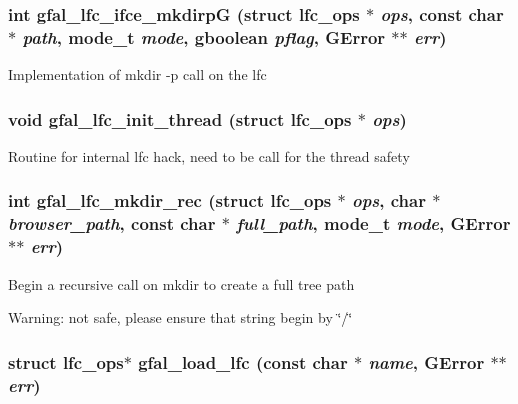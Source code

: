 \subsubsection{\setlength{\rightskip}{0pt plus 5cm}int gfal\_\-lfc\_\-ifce\_\-mkdirp\-G (struct lfc\_\-ops $\ast$ {\em ops}, const char $\ast$ {\em path}, mode\_\-t {\em mode}, gboolean {\em pflag}, GError $\ast$$\ast$ {\em err})}\label{lfc__ifce__ng_8c_9fa43925882e2e196e0020b529827d3c}


Implementation of mkdir -p call on the lfc 
\subsubsection{\setlength{\rightskip}{0pt plus 5cm}void gfal\_\-lfc\_\-init\_\-thread (struct lfc\_\-ops $\ast$ {\em ops})}\label{lfc__ifce__ng_8c_aed5d8ab4c88e918990444e53930bfa4}


Routine for internal lfc hack, need to be call for the thread safety 
\subsubsection{\setlength{\rightskip}{0pt plus 5cm}int gfal\_\-lfc\_\-mkdir\_\-rec (struct lfc\_\-ops $\ast$ {\em ops}, char $\ast$ {\em browser\_\-path}, const char $\ast$ {\em full\_\-path}, mode\_\-t {\em mode}, GError $\ast$$\ast$ {\em err})}\label{lfc__ifce__ng_8c_0d7c361d951ac79fee504d5125485033}


Begin a recursive call on mkdir to create a full tree path \begin{Desc}
\item[Warning:]not safe, please ensure that string begin by \char`\"{}/\char`\"{} \end{Desc}
\subsubsection{\setlength{\rightskip}{0pt plus 5cm}struct lfc\_\-ops$\ast$ gfal\_\-load\_\-lfc (const char $\ast$ {\em name}, GError $\ast$$\ast$ {\em err})}\label{lfc__ifce__ng_8c_7c91643749a2c5d7e8043c0e42d00fd6}


